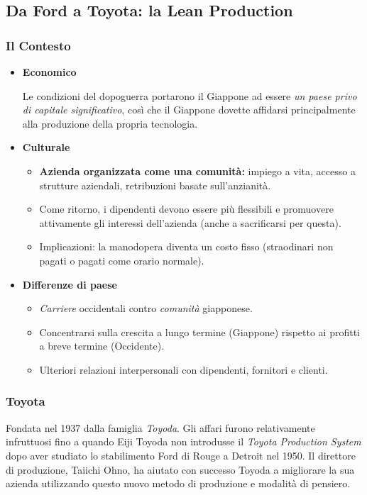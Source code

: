 \documentclass[a4paper,portrait,12pt]{article}
\theoremstyle{definition}
\begin{document}
\subsection{Da Ford a Toyota: la Lean Production}

\subsubsection{Il Contesto}
\begin{itemize}
\item \textbf{Economico}
	\begin{itemize}
	Le condizioni del dopoguerra portarono il Giappone ad essere \emph{un paese privo di capitale significativo}, così che il Giappone dovette affidarsi principalmente alla produzione della propria tecnologia.
	\end{itemize}

\item \textbf{Culturale}
	\begin{itemize}
	\item \textbf{Azienda organizzata come una comunità:} impiego a vita, accesso a strutture aziendali, retribuzioni basate sull'anzianità.
	\item Come ritorno, i dipendenti devono essere più flessibili e promuovere attivamente gli interessi dell'azienda (anche a sacrificarsi per questa).
	\item Implicazioni: la manodopera diventa un costo fisso (straodinari non pagati o pagati come orario normale).
	\end{itemize}
	
\item \textbf{Differenze di paese}
	\begin{itemize}
	\item \emph{Carriere} occidentali contro \emph{comunità} giapponese.
	\item Concentrarsi sulla crescita a lungo termine (Giappone) rispetto ai profitti a breve termine (Occidente).
	\item Ulteriori relazioni interpersonali con dipendenti, fornitori e clienti.
	\end{itemize}
\end{itemize}

\subsubsection{Toyota}
Fondata nel 1937 dalla famiglia \emph{Toyoda}.
Gli affari furono relativamente infruttuosi fino a quando Eiji Toyoda non introdusse il \emph{Toyota Production System} dopo aver studiato lo stabilimento Ford di Rouge a Detroit nel 1950.
Il direttore di produzione, Taiichi Ohno, ha aiutato con successo Toyoda a migliorare la sua azienda utilizzando questo nuovo metodo di produzione e modalità di pensiero.\\
\end{document}
